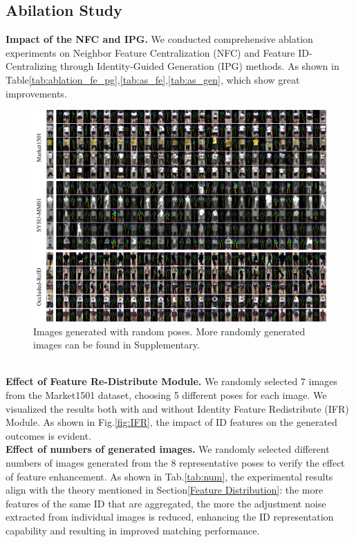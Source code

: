 \subsection{Abilation Study}
\textbf{Impact of the NFC and IPG.}
We conducted comprehensive ablation experiments on Neighbor Feature Centralization (NFC) and Feature ID-Centralizing through Identity-Guided Generation (IPG) methods. As shown in Table\ref{tab:ablation_fe_pg},\ref{tab:as_fe},\ref{tab:as_gen}, which show great improvements.
\begin{figure}
\centering
\includegraphics[width=\linewidth]{figs/pdf/random_sub_png.pdf}
\caption{Images generated with random poses. More randomly generated images can be found in Supplementary.}
\label{fig:randompose}
\end{figure}
\\
\textbf{Effect of Feature Re-Distribute Module.}
We randomly selected 7 images from the Market1501 dataset, choosing 5 different poses for each image. We visualized the results both with and without Identity Feature Redistribute (IFR) Module. As shown in Fig.\ref{fig:IFR}, the impact of ID features on the generated outcomes is evident.
\\
\textbf{Effect of numbers of generated images.}
We randomly selected different numbers of images generated from the 8 representative poses to verify the effect of feature enhancement. As shown in Tab.\ref{tab:num}, the experimental results align with the theory mentioned in Section\ref{Feature Distribution}: the more features of the same ID that are aggregated, the more the adjustment noise extracted from individual images is reduced, enhancing the ID representation capability and resulting in improved matching performance.



